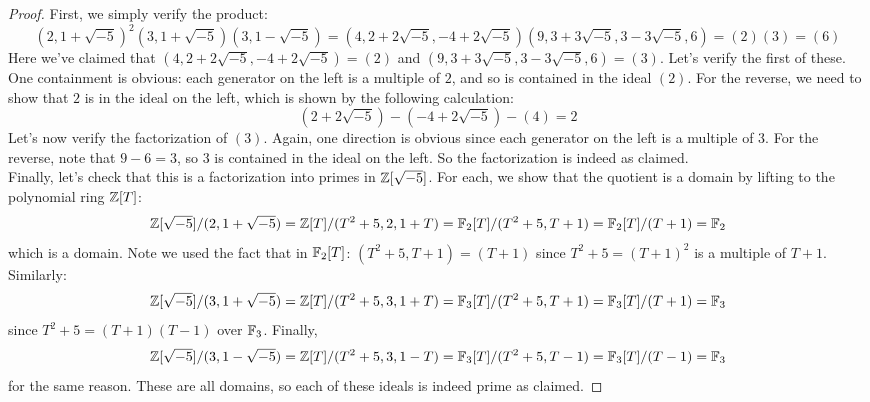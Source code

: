 \begin{proof}
	First, we simply verify the product:
	\[ (2,1+\sqrt{-5})^2(3,1+\sqrt{-5})(3,1-\sqrt{-5}) = (4,2+2\sqrt{-5},-4+2\sqrt{-5})(9,3+3\sqrt{-5},3-3\sqrt{-5},6) = (2)(3) = (6) \]
	Here we've claimed that $(4,2+2\sqrt{-5},-4+2\sqrt{-5}) = (2)$ and $(9,3+3\sqrt{-5},3-3\sqrt{-5},6) = (3)$. Let's verify the first of these. One containment is obvious: each generator on the left is a multiple of $2$, and so is contained in the ideal $(2)$. For the reverse, we need to show that $2$ is in the ideal on the left, which is shown by the following calculation:
	\[ (2+2\sqrt{-5})-(-4+2\sqrt{-5})-(4) = 2 \]
	Let's now verify the factorization of $(3)$. Again, one direction is obvious since each generator on the left is a multiple of 3. For the reverse, note that $9-6 = 3$, so 3 is contained in the ideal on the left. So the factorization is indeed as claimed. \\
	
	Finally, let's check that this is a factorization into primes in $\mathbb{Z}[\sqrt{-5}]$. For each, we show that the quotient is a domain by lifting to the polynomial ring $\mathbb{Z}[T]$:
	\[ \mathbb{Z}[\sqrt{-5}]/(2,1+\sqrt{-5}) = \mathbb{Z}[T]/(T^2+5,2,1+T) = \mathbb{F}_2[T]/(T^2+5,T+1) = \mathbb{F}_2[T]/(T+1) = \mathbb{F}_2 \]
	which is a domain. Note we used the fact that in $\mathbb{F}_2[T]$: $(T^2+5,T+1) = (T+1)$ since $T^2+5 = (T+1)^2$ is a multiple of $T+1$. Similarly:
	\[ \mathbb{Z}[\sqrt{-5}]/(3,1+\sqrt{-5}) = \mathbb{Z}[T]/(T^2+5,3,1+T) = \mathbb{F}_3[T]/(T^2+5,T+1) = \mathbb{F}_3[T]/(T+1) = \mathbb{F}_3 \]
	since $T^2+5 = (T+1)(T-1)$ over $\mathbb{F}_3$. Finally,
	\[ \mathbb{Z}[\sqrt{-5}]/(3,1-\sqrt{-5}) = \mathbb{Z}[T]/(T^2+5,3,1-T) = \mathbb{F}_3[T]/(T^2+5,T-1) = \mathbb{F}_3[T]/(T-1) = \mathbb{F}_3 \]
	for the same reason. These are all domains, so each of these ideals is indeed prime as claimed.
\end{proof}
